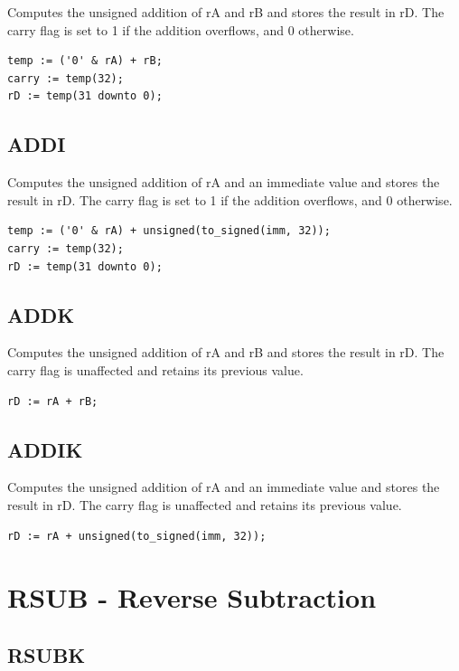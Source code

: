 \documentclass{UoYCSproject}
\begin{document}
Computes the unsigned addition of rA and rB and stores the result in rD. The carry flag is set to 1 if the addition
overflows, and 0 otherwise.

\begin{lstlisting}
temp := ('0' & rA) + rB;
carry := temp(32);
rD := temp(31 downto 0);
\end{lstlisting}

\subsection{ADDI}

Computes the unsigned addition of rA and an immediate value and stores the result in rD. The carry flag is set to 1 if the
addition overflows, and 0 otherwise.

\begin{lstlisting}
temp := ('0' & rA) + unsigned(to_signed(imm, 32));
carry := temp(32);
rD := temp(31 downto 0);
\end{lstlisting}

\subsection{ADDK}

Computes the unsigned addition of rA and rB and stores the result in rD. The carry flag is unaffected and retains its previous
value.

\begin{lstlisting}
rD := rA + rB;
\end{lstlisting}

\subsection{ADDIK}

Computes the unsigned addition of rA and an immediate value and stores the result in rD. The carry flag is unaffected and retains
its previous value.

\begin{lstlisting}
rD := rA + unsigned(to_signed(imm, 32));
\end{lstlisting}

\section{RSUB - Reverse Subtraction}

\subsection{RSUBK}
\end{document}

